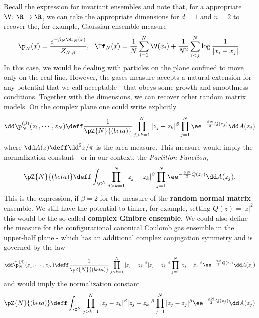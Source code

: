 Recall the expression for invariant ensembles and note that, for a appropriate $\V \colon \R \rightarrow \R$, we can take the appropriate dimensions for $d=1$ and $n = 2$ to recover the, for example, Gaussian ensemble measure
\begin{equation}
	\p_N(\vec{x}) = \frac{e^{-\beta_N \Hf_N(\vec{x})}}{Z_{N,\beta}}, \ \ \Hf_N(\vec{x}) = \frac{1}{N} \sum_{i = 1}^{N} \V(x_i) + \frac{1}{N^2} \sum_{i < j}^{N} \log{\frac{1}{|x_i - x_j|}}.
\end{equation}
In this case, we would be dealing with particles on the plane confined to move only on the real line. However, the gases measure accepts a natural extension for any potential that we call acceptable - that obeys some growth and smoothness conditions. Together with the dimensions, we can recover other random matrix models. On the complex plane one could write explicitly
\begin{equation}
	\dd \p_N^{(\beta)} (z_1, \cdots, z_N) \deff \frac{1}{\pZ{N}{(beta)}} \prod_{j > k = 1}^{N} |z_j - z_k|^\beta \prod_{j=1}^{N} \ee^{- \frac{\beta N}{2} Q(z_j)} \dd A(z_j)
	\label{Equation: Measure Normal Matrix}
\end{equation}
where $\dd A(z) \deff \dd^2 z / \pi$ is the area measure. This measure would imply the normalization constant - or in our context, the \textit{Partition Function},
\begin{equation}
	\pZ{N}{(beta)} \deff \int_{\C^N} \prod_{j > k = 1}^{N} |z_j - z_k|^\beta \prod_{j=1}^{N} \ee^{- \frac{\beta N}{2} Q(z_j)} \dd A(z_j).
\end{equation}
This is the expression, if $\beta = 2$ for the measure of the \textbf{random normal matrix} ensemble. We still have the potential to tinker, for example, setting $Q(z) = |z|^2$ this would be the so-called \textbf{complex Ginibre ensemble}. We could also define the measure for the configurational canonical Coulomb gas ensemble in the upper-half plane  - which has an additional complex conjugation symmetry and is governed by the law 
\begin{equation}
	\dd \tilde{\p}_N^{(\beta)} (z_1, \cdots, z_N) \deff \frac{1}{\tilde{\pZ{N}{(beta)}}} \prod_{j > k = 1}^{N} |z_j - z_k|^\beta |z_j - \bar{z}_k|^\beta \prod_{j=1}^{N} |z_j - \bar{z}_j|^\beta  \ee^{- \frac{\beta N}{2} Q(z_j)} \dd A(z_j)
\end{equation}
and would imply the normalization constant
\begin{equation}
	\tilde{\pZ{N}{(beta)}} \deff \int_{\C^N} \prod_{j > k = 1}^{N} |z_j - z_k|^\beta |z_j - \bar{z}_k|^\beta \prod_{j=1}^{N} |z_j - \bar{z}_j|^\beta  \ee^{- \frac{\beta N}{2} Q(z_j)} \dd A(z_j)
\end{equation}
